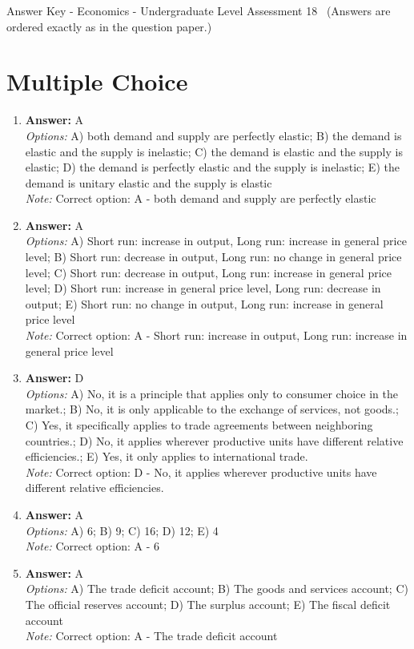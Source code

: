 \documentclass[12pt]{article}
\begin{document}
\begin{center}
Answer Key - Economics - Undergraduate Level Assessment 18 \
\small (Answers are ordered exactly as in the question paper.)
\end{center}

\section*{Multiple Choice}
\begin{enumerate}[label=\arabic*.]
\item \textbf{Answer:} A
\\ \textit{Options:} A) both demand and supply are perfectly elastic; B) the demand is elastic and the supply is inelastic; C) the demand is elastic and the supply is elastic; D) the demand is perfectly elastic and the supply is inelastic; E) the demand is unitary elastic and the supply is elastic
\\ \textit{Note:} Correct option: A - both demand and supply are perfectly elastic
\item \textbf{Answer:} A
\\ \textit{Options:} A) Short run: increase in output, Long run: increase in general price level; B) Short run: decrease in output, Long run: no change in general price level; C) Short run: decrease in output, Long run: increase in general price level; D) Short run: increase in general price level, Long run: decrease in output; E) Short run: no change in output, Long run: increase in general price level
\\ \textit{Note:} Correct option: A - Short run: increase in output, Long run: increase in general price level
\item \textbf{Answer:} D
\\ \textit{Options:} A) No, it is a principle that applies only to consumer choice in the market.; B) No, it is only applicable to the exchange of services, not goods.; C) Yes, it specifically applies to trade agreements between neighboring countries.; D) No, it applies wherever productive units have different relative efficiencies.; E) Yes, it only applies to international trade.
\\ \textit{Note:} Correct option: D - No, it applies wherever productive units have different relative efficiencies.
\item \textbf{Answer:} A
\\ \textit{Options:} A) 6; B) 9; C) 16; D) 12; E) 4
\\ \textit{Note:} Correct option: A - 6
\item \textbf{Answer:} A
\\ \textit{Options:} A) The trade deficit account; B) The goods and services account; C) The official reserves account; D) The surplus account; E) The fiscal deficit account
\\ \textit{Note:} Correct option: A - The trade deficit account
\end{enumerate}
\end{document}
